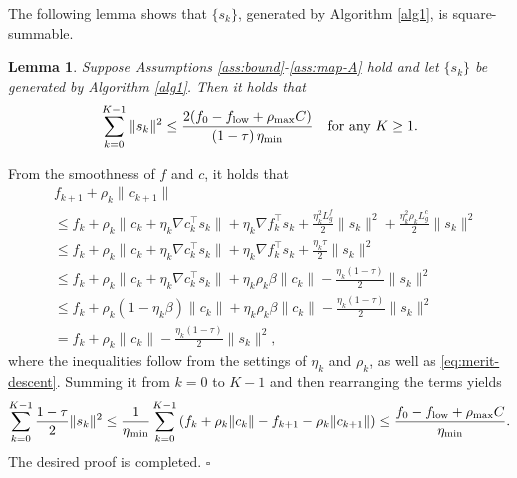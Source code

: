 \documentclass[11pt]{article}
\newenvironment{proof}{{\noindent\it Proof.}\quad}{\hfill $\square$\par}
\newcommand{\be}{\begin{equation}}
\newcommand{\ee}{\end{equation}}
\newtheorem{lemma}{Lemma}
\begin{document}
The following lemma shows that $\{s_k\}$, generated by Algorithm \ref{alg1}, is square-summable. 
\begin{lemma}\label{thm:det-convergence}
    Suppose Assumptions \ref{ass:bound}-\ref{ass:map-A} hold and let $\{s_k\}$ be generated by Algorithm \ref{alg1}. %
    Then it holds that
    \begin{align*}
    \sum_{k=0}^{K-1} \|s_k\|^2 
    \leq \frac{2(f_0 - f_{\rm low}+\rho_{\rm max} C)}{\left(1-\tau\right)\eta_{\rm min} } \quad \mbox{for any } K\ge 1.
    \end{align*}
\end{lemma}
\begin{proof}
    From the smoothness of \(f\) and \(c\), it holds that
    \be\begin{aligned}\label{descent}
       & f_{k+1} + \rho_k \|c_{k+1}\| \\
       &\leq f_k + \rho_k \|c_k + \eta_k \nabla c_k^\top s_k\| + \eta_k \nabla f_k^\top s_k + \frac{\eta_k^2 L_g^f}{2}\|s_k\|^2 + \frac{\eta_k^2\rho_kL_g^c}{2}\|s_k\|^2\\
        &\leq f_k + \rho_k \|c_k + \eta_k \nabla c_k^\top s_k\| +  \eta_k \nabla f_k^\top s_k + \frac{\eta_k \tau}{2}\|s_k\|^2\\ 
        &\leq f_k + \rho_k \|c_k + \eta_k \nabla c_k^\top s_k\| +  \eta_k \rho_k \beta \|c_k\| - \frac{\eta_k\left(1-\tau\right)}{2}\|s_k\|^2\\
        &\leq f_k + \rho_k (1-\eta_k \beta)\|c_k\| + \eta_k \rho_k \beta \|c_k\| - \frac{\eta_k\left(1-\tau\right)}{2}\|s_k\|^2\\
        &= f_k + \rho_k \|c_k\|- \frac{\eta_k\left(1-\tau\right)}{2}\|s_k\|^2,
    \end{aligned}\ee
    where the inequalities follow from  the settings of \(\eta_k\) and \(\rho_k\), as well as \eqref{eq:merit-descent}. 
    Summing it from \(k=0\) to \(K-1\) and then rearranging the terms yields  
    \begin{align*}
     \sum_{k=0}^{K-1} \frac{1-\tau}{2} \|s_k\|^2 \leq \frac{1}{\eta_{\rm min} } \sum_{k=0}^{K-1} \left(f_k+\rho_k \|c_k\| - f_{k+1} - \rho_k \|c_{k+1}\|\right)
    \leq \frac{f_0 - f_{\rm low}+\rho_{\rm max} C}{\eta_{\rm min} }.
    \end{align*}
    The desired proof is completed.
\end{proof}
\end{document}
